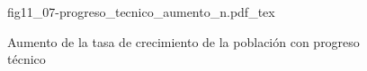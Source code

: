 \begin{figure}[h]
\centering
\def\svgwidth{0.5\textwidth}
{fig11_07-progreso_tecnico_aumento_n.pdf_tex}
\caption{Aumento de la tasa de crecimiento de la población con progreso técnico}
\label{fig11_07-progreso_tecnico_aumento_n}
\end{figure}